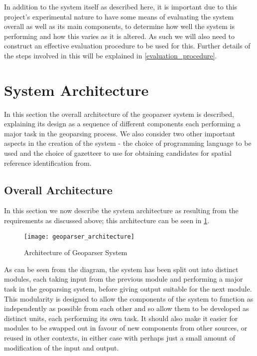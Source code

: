 \documentclass[12pt, a4paper]{report}
\begin{document}
In addition to the system itself as described here, it is important due to this project's experimental nature to have some means of evaluating the system overall as well as its main components, to determine how well the system is performing and how this varies as it is altered. As such we will also need to construct an effective evaluation procedure to be used for this. Further details of the steps involved in this will be explained in \ref{evaluation_procedure}. 

\section{System Architecture}


In this section the overall architecture of the geoparser system is described, explaining its design as a sequence of different components each performing a major task in the geoparsing process. We also consider two other important aspects in the creation of the system - the choice of programming language to be used and the choice of gazetteer to use for obtaining candidates for spatial reference identification from.

\subsection{Overall Architecture}
\label{overall_architecture}


In this section we now describe the system architecture as resulting from the requirements as discussed above; this architecture can be seen in \ref{fig:geoparser_architecture}.

\begin{figure}[h!]
  \centering
  \texttt{[image: geoparser\_architecture]}
  \caption{Architecture of Geoparser System}
  \label{fig:geoparser_architecture}
\end{figure}

As can be seen from the diagram, the system has been split out into distinct modules, each taking input from the previous module and performing a major task in the geoparsing system, before giving output suitable for the next module. This modularity is designed to allow the components of the system to function as independently as possible from each other and so allow them to be developed as distinct units, each performing its own task. It should also make it easier for modules to be swapped out in favour of new components from other sources, or reused in other contexts, in either case with perhaps just a small amount of modification of the input and output.
\end{document}
